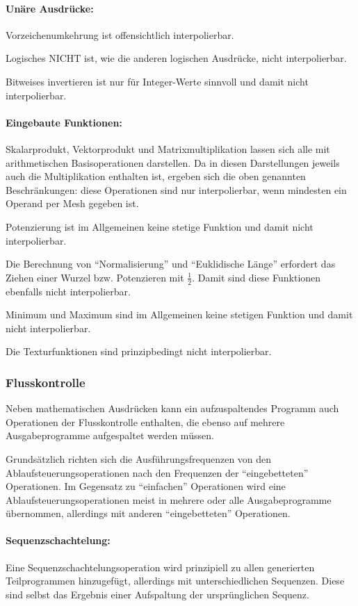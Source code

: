 \documentclass[twoside,a4paper,fleqn,12pt]{book}
\begin{document}
\paragraph{Unäre Ausdrücke:} Vorzeichenumkehrung ist offensichtlich interpolierbar.

Logisches NICHT ist, wie die anderen logischen Ausdrücke, nicht interpolierbar.

Bitweises invertieren ist nur für Integer-Werte sinnvoll und damit nicht interpolierbar.

\paragraph{Eingebaute Funktionen:} \label{split_builtins}
Skalarprodukt, Vektorprodukt und Matrixmultiplikation lassen sich alle mit arithmetischen Basisoperationen darstellen.
Da in diesen Darstellungen jeweils auch die Multiplikation enthalten ist, ergeben sich die oben genannten Beschränkungen:
diese Operationen sind nur interpolierbar, wenn mindesten ein Operand per Mesh gegeben ist.

Potenzierung ist im Allgemeinen keine stetige Funktion und damit nicht interpolierbar.

Die Berechnung von "`Normalisierung"' und "`Euklidische Länge"' erfordert das Ziehen einer Wurzel bzw. Potenzieren mit $\frac{1}{2}$.
Damit sind diese Funktionen ebenfalls nicht interpolierbar.

Minimum und Maximum sind im Allgemeinen keine stetigen Funktion und damit nicht interpolierbar.

Die Texturfunktionen sind prinzipbedingt nicht interpolierbar.

\subsubsection{Flusskontrolle}

Neben mathematischen Ausdrücken kann ein aufzuspaltendes Programm auch Operationen der Flusskontrolle enthalten,
die ebenso auf mehrere Ausgabeprogramme aufgespaltet werden müssen.

Grundsätzlich richten sich die Ausführungsfrequenzen von den Ablaufsteuerungsoperationen nach den Frequenzen der 
"`eingebetteten"' Operationen. Im Gegensatz zu "`einfachen"' Operationen wird eine Ablaufsteuerungsoperationen meist
in mehrere oder alle Ausgabeprogramme übernommen, allerdings mit anderen "`eingebetteten"' Operationen.

\paragraph{Sequenzschachtelung:} Eine Sequenzschachtelungsoperation wird prinzipiell zu allen generierten Teilprogrammen hinzugefügt,
allerdings mit unterschiedlichen Sequenzen. Diese sind selbst das Ergebnis einer Aufspaltung der ursprünglichen Sequenz.
\end{document}
